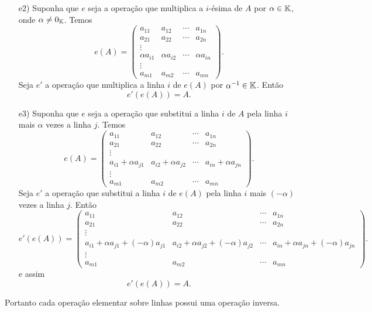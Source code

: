 \begin{prova}
\begin{enumerate}
		\item [e2)] Suponha que $e$ seja a opera\c{c}\~ao que multiplica a $i$-\'esima de $A$ por $\alpha \in \mathbb{K}$, onde $\alpha \ne 0_{\mathbb{K}}$. Temos
		\[
		   e(A) = 
		   			\begin{pmatrix}
						a_{11} & a_{12} & \cdots & a_{1n}\\
						a_{21} & a_{22} & \cdots & a_{2n}\\
						\vdots\\
						\alpha a_{i1} & \alpha a_{i2} & \cdots & \alpha a_{in}\\
						\vdots\\
						a_{m1} & a_{m2} & \cdots & a_{mn}
				    \end{pmatrix}.
		\]
		Seja $e'$ a opera\c{c}\~ao que multiplica a linha $i$ de $e(A)$ por $\alpha^{-1} \in \mathbb{K}$. Ent\~ao
		\[
			e'(e(A)) = A.
		\]
		\item [e3)] Suponha que $e$ seja a opera\c{c}\~ao que substitui a linha $i$ de $A$ pela linha $i$ mais $\alpha$ vezes a linha $j$. Temos
		\[
		   e(A) = 
		   			\begin{pmatrix}
						a_{11} & a_{12} & \cdots & a_{1n}\\
						a_{21} & a_{22} & \cdots & a_{2n}\\
						\vdots\\
						a_{i1} + \alpha a_{j1} & a_{i2} + \alpha a_{j2} & \cdots & a_{in} + \alpha a_{jn}\\
						\vdots\\
						a_{m1} & a_{m2} & \cdots & a_{mn}
				    \end{pmatrix}.
		\]
		Seja $e'$ a opera\c{c}\~ao que substitui a linha $i$ de $e(A)$ pela linha $i$ mais $(-\alpha)$ vezes a linha $j$. Ent\~ao
		\[
		   e'(e(A)) = 
		   			\begin{pmatrix}
						a_{11} & a_{12} & \cdots & a_{1n}\\
						a_{21} & a_{22} & \cdots & a_{2n}\\
						\vdots\\
						a_{i1} + \alpha a_{j1} + (-\alpha)a_{j1} & a_{i2} + \alpha a_{j2} + (-\alpha)a_{j2} & \cdots & a_{in} + \alpha a_{jn} + (-\alpha)a_{jn}\\
						\vdots\\
						a_{m1} & a_{m2} & \cdots & a_{mn}
				    \end{pmatrix}.
		\]
		e assim
		\[
			e'(e(A)) = A.
		\]
	\end{enumerate}
	Portanto cada opera\c{c}\~ao elementar sobre linhas possui uma opera\c{c}\~ao inversa.
\end{prova}

